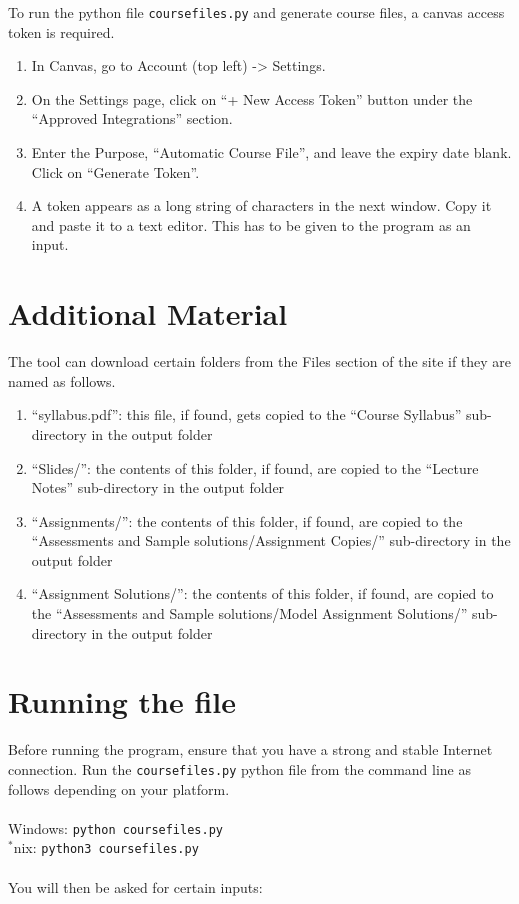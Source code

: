 \documentclass{article}
\begin{document}
To run the python file \texttt{coursefiles.py} and generate course
files, a canvas access token is required.

\begin{enumerate}
\def\labelenumi{\arabic{enumi}.}
\item
  In Canvas, go to Account (top left) -\textgreater{} Settings.
\item
  On the Settings page, click on ``+ New Access Token'' button under the
  ``Approved Integrations'' section.
\item
  Enter the Purpose, ``Automatic Course File'', and leave the expiry
  date blank. Click on ``Generate Token''.
\item
  A token appears as a long string of characters in the next window.
  Copy it and paste it to a text editor. This has to be given to the
  program as an input.
\end{enumerate}

\section{Additional Material}

The tool can download certain folders from the Files section of the site
if they are named as follows.

\begin{enumerate}
\def\labelenumi{\arabic{enumi}.}
\item
  ``syllabus.pdf'': this file, if found, gets copied to the ``Course
  Syllabus'' sub-directory in the output folder
\item
  ``Slides/'': the contents of this folder, if found, are copied to the
  ``Lecture Notes'' sub-directory in the output folder
\item
  ``Assignments/'': the contents of this folder, if found, are copied to
  the ``Assessments and Sample solutions/Assignment Copies/''
  sub-directory in the output folder
\item
  ``Assignment Solutions/'': the contents of this folder, if found, are
  copied to the ``Assessments and Sample solutions/Model Assignment
  Solutions/'' sub-directory in the output folder
\end{enumerate}

\section{Running the file}

Before running the program, ensure that you have a strong and stable
Internet connection. Run the \texttt{coursefiles.py} python file from
the command line as follows depending on your platform.
\\\\Windows: \texttt{python\ coursefiles.py}\\
$^*$nix: \texttt{python3\ coursefiles.py}\\\\
You will then be asked for certain inputs: 
\end{document}
